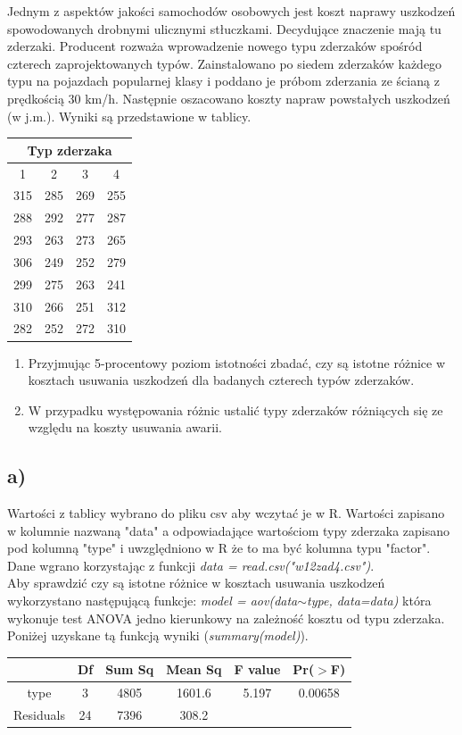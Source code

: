 \documentclass{article}
\begin{document}
Jednym z aspektów jakości samochodów osobowych jest koszt naprawy uszkodzeń spowodowanych drobnymi ulicznymi stłuczkami. Decydujące znaczenie mają tu zderzaki. Producent rozważa wprowadzenie nowego typu
zderzaków spośród czterech zaprojektowanych typów. Zainstalowano po siedem zderzaków każdego typu na pojazdach
popularnej klasy i poddano je próbom zderzania ze ścianą
z prędkością 30 km/h. Następnie oszacowano koszty napraw
powstałych uszkodzeń (w j.m.). Wyniki są przedstawione w
tablicy.

\begin{center} \begin{tabular}{|c|c|c|c|} \hline
\multicolumn{4}{|c|}{Typ zderzaka} \\ \hline
1 & 2 & 3 & 4 \\ \hline
315 & 285 & 269 & 255 \\ \hline
288 & 292 & 277 & 287 \\ \hline
293 & 263 & 273 & 265 \\ \hline
306 & 249 & 252 & 279 \\ \hline
299 & 275 & 263 & 241 \\ \hline
310 & 266 & 251 & 312 \\ \hline
282 & 252 & 272 & 310 \\ \hline
\end{tabular} \end{center}

\begin{enumerate}[label = \alph*)]
\item Przyjmując 5-procentowy poziom istotności zbadać, czy są
istotne różnice w kosztach usuwania uszkodzeń dla badanych
czterech typów zderzaków.
\item W przypadku występowania różnic ustalić typy zderzaków
różniących się ze względu na koszty usuwania awarii.
\end{enumerate}

\subsection{a)}
Wartości z tablicy wybrano do pliku csv aby wczytać je w R. Wartości zapisano w kolumnie nazwaną "data" a odpowiadające wartościom typy zderzaka zapisano pod kolumną "type" i uwzględniono w R że to ma być kolumna typu "factor". Dane wgrano korzystając z funkcji \textit{data = read.csv("w12zad4.csv")}. \\
Aby sprawdzić czy są istotne różnice w kosztach usuwania uszkodzeń wykorzystano następującą funkcje: \textit{model = aov(data$\sim$type, data=data)} która wykonuje test ANOVA jedno kierunkowy na zależność kosztu od typu zderzaka. Poniżej uzyskane tą funkcją wyniki (\textit{summary(model)}).
\begin{center} \begin{tabular}{|c|c|c|c|c|c|} \hline
& Df & Sum Sq & Mean Sq & F value & Pr($>$F) \\ \hline
type & 3 & 4805 & 1601.6 & 5.197 & 0.00658  \\ \hline
Residuals & 24 & 7396 & 308.2 & \multicolumn{2}{|c|}{} \\ \hline
\end{tabular} \end{center}
\end{document}
